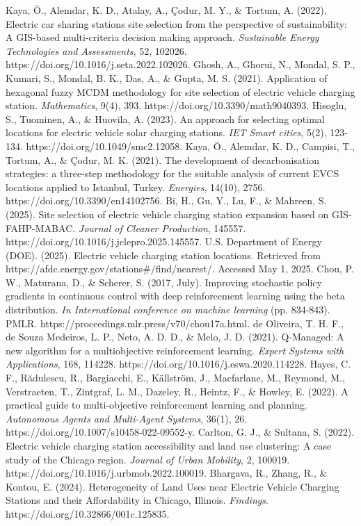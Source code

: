 \documentclass[preprint,12pt]{elsarticle}
\begin{document}
\begin{thebibliography}{00}
Kaya, Ö., Alemdar, K. D., Atalay, A., Çodur, M. Y., \& Tortum, A. (2022). Electric car sharing stations site selection from the perspective of sustainability: A GIS-based multi-criteria decision making approach. \textit{Sustainable Energy Technologies and Assessments}, 52, 102026. https://doi.org/10.1016/j.seta.2022.102026.
Ghosh, A., Ghorui, N., Mondal, S. P., Kumari, S., Mondal, B. K., Das, A., \& Gupta, M. S. (2021). Application of hexagonal fuzzy MCDM methodology for site selection of electric vehicle charging station. \textit{Mathematics}, 9(4), 393. https://doi.org/10.3390/math9040393.
Hisoglu, S., Tuominen, A., \& Huovila, A. (2023). An approach for selecting optimal locations for electric vehicle solar charging stations. \textit{IET Smart cities}, 5(2), 123-134. https://doi.org/10.1049/smc2.12058.
Kaya, Ö., Alemdar, K. D., Campisi, T., Tortum, A., \& Çodur, M. K. (2021). The development of decarbonisation strategies: a three-step methodology for the suitable analysis of current EVCS locations applied to Istanbul, Turkey. \textit{Energies}, 14(10), 2756. https://doi.org/10.3390/en14102756.
Bi, H., Gu, Y., Lu, F., \& Mahreen, S. (2025). Site selection of electric vehicle charging station expansion based on GIS-FAHP-MABAC. \textit{Journal of Cleaner Production}, 145557. https://doi.org/10.1016/j.jclepro.2025.145557.
U.S. Department of Energy (DOE). (2025). Electric vehicle charging station locations. Retrieved from https://afdc.energy.gov/stations\#/find/nearest/. Accessed May 1, 2025.
Chou, P. W., Maturana, D., \& Scherer, S. (2017, July). Improving stochastic policy gradients in continuous control with deep reinforcement learning using the beta distribution. \textit{In International conference on machine learning} (pp. 834-843). PMLR. https://proceedings.mlr.press/v70/chou17a.html.
de Oliveira, T. H. F., de Souza Medeiros, L. P., Neto, A. D. D., \& Melo, J. D. (2021). Q-Managed: A new algorithm for a multiobjective reinforcement learning. \textit{Expert Systems with Applications}, 168, 114228. https://doi.org/10.1016/j.eswa.2020.114228.
Hayes, C. F., Rădulescu, R., Bargiacchi, E., Källström, J., Macfarlane, M., Reymond, M., Verstraeten, T., Zintgraf, L. M., Dazeley, R., Heintz, F., \& Howley, E. (2022). A practical guide to multi-objective reinforcement learning and planning. \textit{Autonomous Agents and Multi-Agent Systems}, 36(1), 26. https://doi.org/10.1007/s10458-022-09552-y.
Carlton, G. J., \& Sultana, S. (2022). Electric vehicle charging station accessibility and land use clustering: A case study of the Chicago region. \textit{Journal of Urban Mobility}, 2, 100019. https://doi.org/10.1016/j.urbmob.2022.100019.
Bhargava, R., Zhang, R., \& Kontou, E. (2024). Heterogeneity of Land Uses near Electric Vehicle Charging Stations and their Affordability in Chicago, Illinois. \textit{Findings}. https://doi.org/10.32866/001c.125835.
\end{thebibliography}
\end{document}
